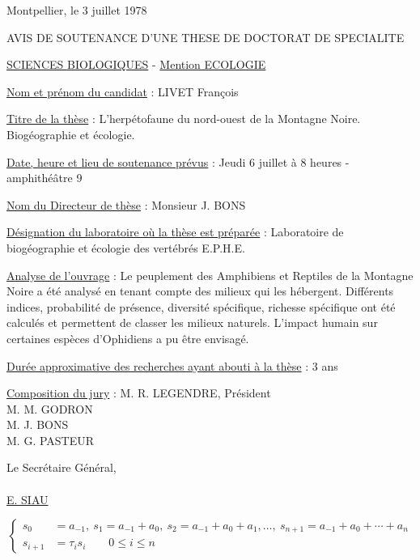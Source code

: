 Montpellier, le 3 juillet 1978

AVIS DE SOUTENANCE D'UNE THESE DE DOCTORAT DE SPECIALITE

\uline{SCIENCES BIOLOGIQUES} - \uline{Mention ECOLOGIE}

\uline{Nom et prénom du candidat} : LIVET François

\uline{Titre de la thèse} : L'herpétofaune du nord-ouest de la Montagne Noire. Biogéographie et écologie.

\uline{Date, heure et lieu de soutenance prévus} : Jeudi 6 juillet à 8 heures - amphithéâtre 9

\uline{Nom du Directeur de thèse} : Monsieur J. BONS

\uline{Désignation du laboratoire où la thèse est préparée} : Laboratoire de biogéographie et écologie des vertébrés E.P.H.E.

\uline{Analyse de l'ouvrage} : Le peuplement des Amphibiens et Reptiles de la Montagne Noire a été analysé en tenant compte des milieux qui les hébergent. Différents indices, probabilité de présence, diversité spécifique, richesse spécifique ont été calculés et permettent de classer les milieux naturels. L'impact humain sur certaines espèces d'Ophidiens a pu être envisagé.

\uline{Durée approximative des recherches ayant abouti à la thèse} : 3 ans

\uline{Composition du jury} : M. R. LEGENDRE, Président\\
M. M. GODRON\\
M. J. BONS\\
M. G. PASTEUR

Le Secrétaire Général,\\

\\

\uline{E. SIAU}


\[
\left\{\begin{aligned}
s_0&=a_{-1},\ s_1=a_{-1}+a_0,\ s_2=a_{-1}+a_0+a_1,\ldots,\ s_{n+1}=a_{-1}+a_0+\cdots+a_n\\
s_{i+1}&=\tau_i s_i\qquad0\le i\le n
\end{aligned}\right.
\]

